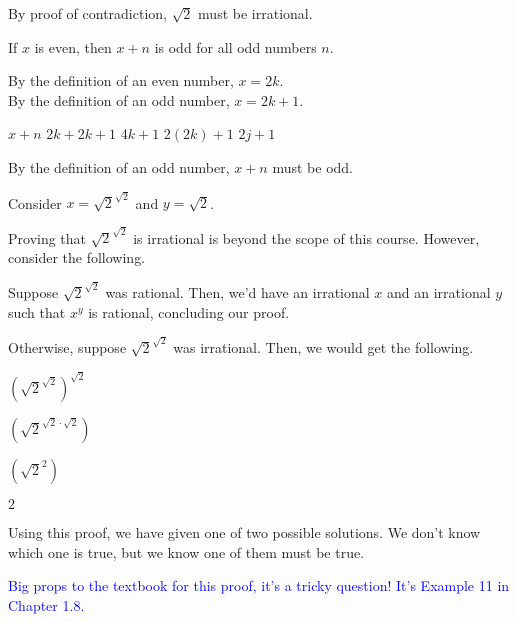 \documentclass{exam}
\begin{document}
\begin{questions}
\begin{subparts}
\begin{center}
By proof of contradiction, \(\sqrt{2}\) must be irrational.

\end{center}

\subpart If \( x\) is even, then \(x+n\) is odd for all odd numbers \(n\).

\begin{center}

By the definition of an even number, \(x = 2k\).\\
By the definition of an odd number, \(x = 2k+1\).

\(x+n\)
\(2k + 2k + 1\)
\(4k + 1\)
\( 2(2k) + 1 \)
\( 2j + 1 \)

By the definition of an odd number, \(x+n\) must be odd.

\end{center}

\end{subparts}

\newpage


\begin{center}

Consider \(x = \sqrt{2}^{\sqrt{2}}\) and \(y = \sqrt{2} \).

Proving that \( \sqrt{2}^{\sqrt{2}} \) is irrational is beyond the scope of this course. However, consider the following.

Suppose \( \sqrt{2}^{\sqrt{2}} \) was rational. Then, we'd have an irrational \(x\) and an irrational \(y\) such that \(x^y\) is rational, concluding our proof.

Otherwise, suppose \( \sqrt{2}^{\sqrt{2}} \) was irrational. Then, we would get the following.

\((\sqrt{2}^{\sqrt{2}})^{\sqrt{2}} \)

\((\sqrt{2}^{\sqrt{2} \cdot \sqrt{2}}) \)

\((\sqrt{2}^{2}) \)

\( 2 \)

Using this proof, we have given one of two possible solutions. We don't know which one is true, but we know one of them must be true.

\textcolor{blue}{Big props to the textbook for this proof, it's a tricky question! It's Example 11 in Chapter 1.8.}


\end{center}
\end{questions}
\end{document}
